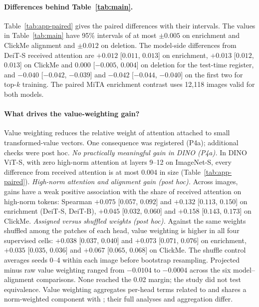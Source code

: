\begin{samepage}\paragraph{Differences behind Table~\ref{tab:main}.} Table~\ref{tab:app-paired} gives the paired differences with their intervals. The values in Table~\ref{tab:main} have 95\% intervals of at most $\pm0.005$ on enrichment and ClickMe alignment and $\pm0.012$ on deletion. The model-side differences from DeiT-S received attention are $+0.012$ [$0.011$, $0.013$] on enrichment, $+0.013$ [$0.012$, $0.013$] on ClickMe and $0.000$ [$-0.005$, $0.004$] on deletion for the test-time register, and $-0.040$ [$-0.042$, $-0.039$] and $-0.042$ [$-0.044$, $-0.040$] on the first two for top-$k$ training. The paired MiTA enrichment contrast uses 12,118 images valid for both models.\par\end{samepage}

\paragraph{What drives the value-weighting gain?} Value weighting reduces the relative weight of attention attached to small transformed-value vectors. One consequence was registered (P4a); additional checks were post hoc. \emph{No practically meaningful gain in DINO (P4a).} In DINO ViT-S, with zero high-norm attention at layers 9--12 on ImageNet-S, every difference from received attention is at most 0.004 in size (Table~\ref{tab:app-paired}). \emph{High-norm attention and alignment gain (post hoc).} Across images, gains have a weak positive association with the share of received attention on high-norm tokens: Spearman $+0.075$ [$0.057$, $0.092$] and $+0.132$ [$0.113$, $0.150$] on enrichment (DeiT-S, DeiT-B), $+0.045$ [$0.032$, $0.060$] and $+0.158$ [$0.143$, $0.173$] on ClickMe. \emph{Assigned versus shuffled weights (post hoc).} Against the same weights shuffled among the patches of each head, value weighting is higher in all four supervised cells: $+0.038$ [$0.037$, $0.040$] and $+0.073$ [$0.071$, $0.076$] on enrichment, $+0.035$ [$0.035$, $0.036$] and $+0.067$ [$0.065$, $0.068$] on ClickMe. The shuffle control averages seeds 0--4 within each image before bootstrap resampling. Projected minus raw value weighting ranged from $-0.0104$ to $-0.0004$ across the six model--alignment comparisons. None reached the 0.02 margin; the study did not test equivalence. Value weighting aggregates per-head terms related to \citet{kobayashi2020} and shares a norm-weighted component with \citet{zhu2024}; their full analyses and aggregation differ.

